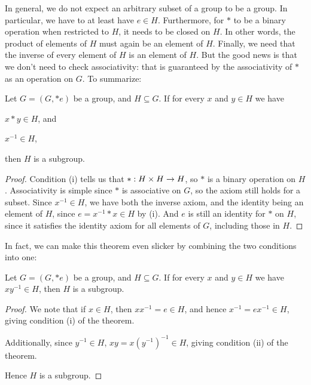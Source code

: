In general, we do not expect an arbitrary subset of a group to be a 
group.  In particular, we have to at least have $e \in H$.  
Furthermore, for $\ast$ to be a binary operation when restricted to 
$H$, it needs to be closed on $H$.  In other words, the product of 
elements of $H$ must again be an element of $H$.  Finally, we need 
that the inverse of every element of $H$ is an element of $H$.  But 
the good news is that we don't need to check associativity: that is 
guaranteed by the associativity of $\ast$ as an operation on $G$.  To 
summarize:

\begin{theorem}\label{thm:subgrouptest}
  Let $G = (G, \ast e)$ be a group, and $H \subseteq G$. If for every $x$ 
  and $y \in H$ we have
  \begin{theoremenum}
    \item $x \ast y \in H$, and
    
    \item $x^{-1} \in H$,
  \end{theoremenum}
  then $H$ is a subgroup.
\end{theorem}
\begin{proof}
  Condition (i) tells us that $\ast: H \times H \to H$, so $\ast$ is a 
  binary operation on $H$.  Associativity is simple since $\ast$ is 
  associative on $G$, so the axiom still holds for a subset.  Since 
  $x^{-1} \in H$, we have both the inverse axiom, and the identity 
  being an element of $H$, since $e = x^{-1} \ast x \in H$ by (i).
  And $e$ is still an identity for $\ast$ on $H$, since it satisfies 
  the identity axiom for all elements of $G$, including those in $H$.
\end{proof}

In fact, we can make this theorem even slicker by combining the two conditions
into one:
\begin{corollary}\label{cor:subgrouptest}
  Let $G = (G, \ast e)$ be a group, and $H \subseteq G$. If for every $x$ 
  and $y \in H$ we have $xy^{-1} \in H$, then $H$ is a subgroup.
\end{corollary}
\begin{proof}
  We note that if $x \in H$, then $xx^{-1} = e \in H$, and hence $x^{-1} = ex^{-1}
  \in H$, giving condition (i) of the theorem.
  
  Additionally, since $y^{-1} \in H$, $xy = x(y^{-1})^{-1} \in H$, giving
  condition (ii) of the theorem.
  
  Hence $H$ is a subgroup.
\end{proof}

